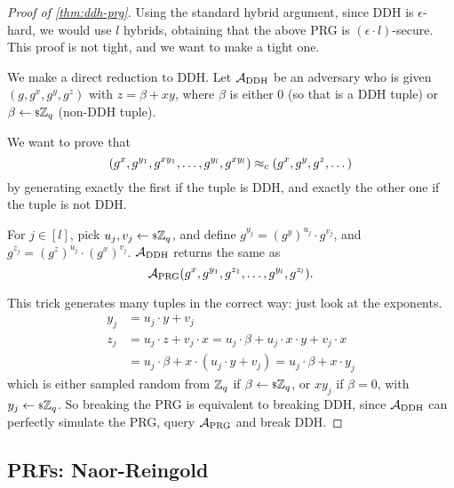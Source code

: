 \begin{proof}[Proof of \cref{thm:ddh-prg}]
	Using the standard hybrid argument, since \ac{DDH} is $\epsilon$-hard, we would use $l$ hybrids, obtaining that the above \ac{PRG} is $(\epsilon \cdot l)$-secure.
	This proof is not tight, and we want to make a tight one.

	We make a direct reduction to \ac{DDH}.
	Let $\mathcal{A}_{\text{DDH}}$ be an adversary who is given $(g, g^x, g^y, g^z)$ with $z = \beta + xy$, where $\beta$ is either $0$ (so that is a \ac{DDH} tuple) or $\beta \leftarrow {\scriptstyle \$} {\mathbb{Z}_q}$ (non-\ac{DDH} tuple).

	We want to prove that
	\begin{equation*}
		(g^{x}, g^{y_1}, g^{x y_1}, \dots, g^{y_l}, g^{x y_l})
		\approx_c
		(g^{x}, g^{y}, g^{z}, \dots)
	\end{equation*}
	by generating exactly the first if the tuple is \ac{DDH}, and exactly the other one if the tuple is not \ac{DDH}.

	For $j \in [l]$, pick $u_j, v_j \leftarrow {\scriptstyle \$} {\mathbb{Z}_q}$, and define $g^{y_j} = \left( g^{y} \right)^{u_j} \cdot g^{v_j}$, and $g^{z_j} = \left( g^z \right)^{u_j} \cdot \left(g^x\right)^{v_j}$.
	$\mathcal{A}_{\text{DDH}}$ returns the same as
	\begin{equation*}
		\mathcal{A}_{\text{PRG}}(g^x, g^{y_1}, g^{z_1}, \dots, g^{y_l}, g^{z_l}).
	\end{equation*}

	This trick generates many tuples in the correct way: just look at the exponents.
	\begin{align*}
		y_j
		& = u_j \cdot y + v_j \\
		z_j
		& = u_j \cdot z + v_j \cdot x
		= u_j \cdot \beta + u_j \cdot x \cdot y + v_j \cdot x \\
		& = u_j \cdot \beta + x \cdot (u_j \cdot y + v_j)
		= u_j \cdot \beta + x \cdot y_j
	\end{align*}
	which is either sampled random from $\mathbb{Z}_q$ if $\beta \leftarrow {\scriptstyle \$} {\mathbb{Z}_q}$, or $x y_j$ if $\beta = 0$, with $y_j \leftarrow {\scriptstyle \$} {\mathbb{Z}_q}$.
	So breaking the \ac{PRG} is equivalent to breaking \ac{DDH}, since $\mathcal{A}_{\text{DDH}}$ can perfectly simulate the \ac{PRG}, query $\mathcal{A}_{\text{PRG}}$ and break \ac{DDH}.
\end{proof}

\subsection{\acp{PRF}: Naor-Reingold}

